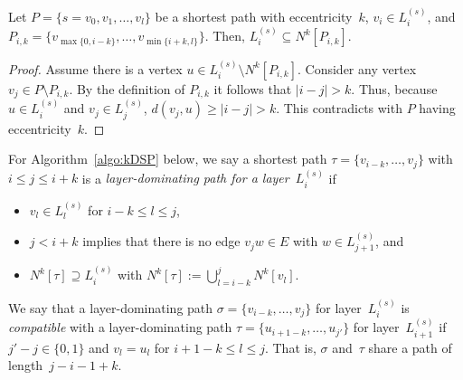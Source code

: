 \begin{lemma}
    \label{lem:localLayerDom}
Let \( P = \big \{ s = v_0, v_1, \ldots, v_l \big \} \) be a shortest path with eccentricity~\( k \), \( v_i \in L_i^{(s)} \), and \( P_{i, k} = \Big \{ v_{\max \{ 0, i - k \}}, \ldots, v_{\min \{ i + k, l \}} \Big \} \).
Then, \( L_i^{(s)} \subseteq N^k[P_{i,k}] \).
\end{lemma}

\begin{proof}
Assume there is a vertex $u \in L_i^{(s)} \setminus N^k[P_{i,k}]$.
Consider any vertex~$v_j \in P \setminus P_{i,k}$.
By the definition of $P_{i,k}$ it follows that $|i-j| > k$.
Thus, because $u \in L_i^{(s)}$ and $v_j \in L_j^{(s)}$, $d(v_j, u) \geq |i-j| > k$.
This contradicts with $P$ having eccentricity~$k$.
\end{proof}

For Algorithm~\ref{algo:kDSP} below, we say a shortest path $\tau = \{ v_{i-k}, \ldots, v_{j} \}$ with $i \leq j \leq i+k$ is a \emph{layer-dominating path for a layer~\( L_i^{(s)} \)} if
\begin{itemize}
    \item
        $v_l \in L_l^{(s)}$ for $i - k \leq l \leq j$,
    \item
        $j < i + k$ implies that there is no edge $v_jw \in E$ with $w \in L_{j + 1}^{(s)}$, and
    \item
        $N^k[\tau] \supseteq L_i^{(s)}$ with $N^k[\tau] := \bigcup_{l = i - k}^{j} N^k[v_l]$.
\end{itemize}
We say that a layer-dominating path $\sigma = \{ v_{i-k}, \ldots, v_{j} \}$ for layer~$L_i^{(s)}$ is \emph{compatible} with a layer-dominating path $\tau = \{ u_{i+1-k}, \ldots, u_{j'} \}$ for layer~$L_{i+1}^{(s)}$ if $j'- j \in \{ 0, 1 \}$ and $v_l = u_l$ for $i + 1 - k \leq l \leq j$.
That is, $\sigma$ and~$\tau$ share a path of length~$j - i - 1 + k$.

